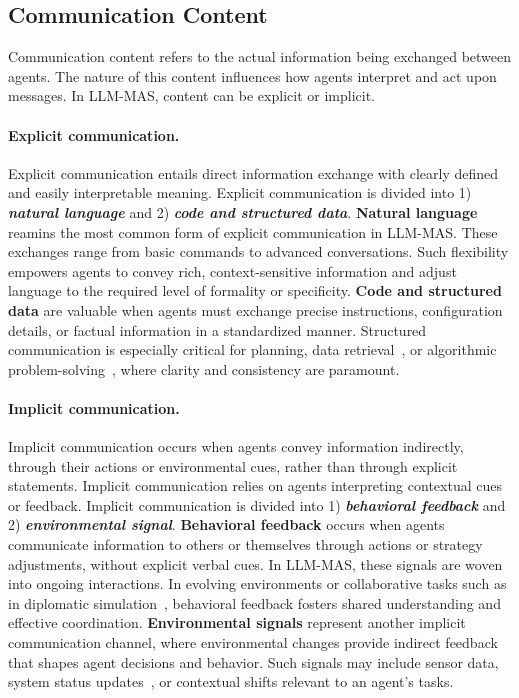 \subsection{Communication Content}
Communication content refers to the actual information being exchanged between agents. The nature of this content influences how agents interpret and act upon messages. In LLM-MAS, content can be explicit or implicit.

\paragraph{Explicit communication.} Explicit communication entails direct information exchange with clearly defined and easily interpretable meaning. Explicit communication is divided into 1) \textbf{\textit{natural language}} and 2) \textbf{\textit {code and structured data}}. \textbf{Natural language} reamins the most common form of explicit communication in LLM-MAS. These exchanges range from basic commands to advanced conversations. Such flexibility empowers agents to convey rich, context-sensitive information and adjust language to the required level of formality or specificity. \textbf{Code and structured data} are valuable when agents must exchange precise instructions, configuration details, or factual information in a standardized manner. Structured communication is especially critical for planning, data retrieval~\cite{mas_for_defence_attack}, or algorithmic problem-solving~\cite{magis_mas_for_github}, where clarity and consistency are paramount.

\paragraph{Implicit communication.} Implicit communication occurs when agents convey information indirectly, through their actions or environmental cues, rather than through explicit statements. Implicit communication relies on agents interpreting contextual cues or feedback. Implicit communication is divided into 1) \textbf{\textit{behavioral feedback}} and 2) \textbf{\textit{environmental signal}}. \textbf{Behavioral feedback} occurs when agents communicate information to others or themselves through actions or strategy adjustments, without explicit verbal cues. In LLM-MAS, these signals are woven into ongoing interactions. In evolving environments or collaborative tasks such as in diplomatic simulation~\cite{richeliey_diplomacy_society}, behavioral feedback fosters shared understanding and effective coordination. \textbf{Environmental signals} represent another implicit communication channel, where environmental changes provide indirect feedback that shapes agent decisions and behavior. Such signals may include sensor data, system status updates~\cite{chatsim_mas_make_scene,social_media_regulation}, or contextual shifts relevant to an agent’s tasks.


